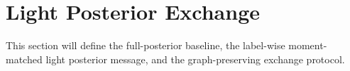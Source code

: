 \section{Light Posterior Exchange}
\label{sec:method}

This section will define the full-posterior baseline, the label-wise moment-matched light posterior message, and the graph-preserving exchange protocol.

